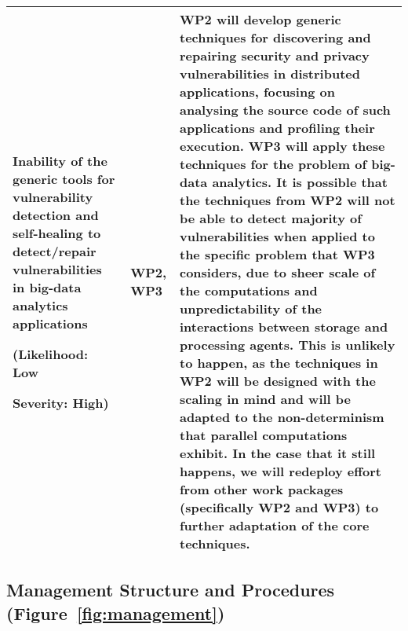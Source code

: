 \documentclass[a4paper,11pt]{article}
\begin{document}
\begin{longtable}{| p{3.5cm} | p{1.5cm} | p{11.8cm}  |}
\\\hline
Inability of the generic tools for vulnerability detection and self-healing to detect/repair vulnerabilities in big-data analytics applications
\par
({\textbf{Likelihood: Low}}
\par
{\textbf{Severity: High}})
& WP2, WP3 &
WP2 will develop generic techniques for discovering and repairing security and privacy vulnerabilities in distributed applications, focusing on analysing the source code of such applications and profiling their execution. WP3 will apply these techniques for the problem of big-data analytics. It is possible that the techniques from WP2 will not be able to detect majority of vulnerabilities when applied to the specific problem that WP3 considers, due to sheer scale of the computations and unpredictability of the interactions between storage and processing agents. This is unlikely to happen, as the techniques in WP2 will be designed with the scaling in mind and will be adapted to the non-determinism that parallel computations exhibit. In the case that it still happens, we will redeploy effort from other work packages (specifically WP2 and WP3) to further adaptation of the core techniques. 
\\\hline
\end{longtable}

\subsection{Management Structure and Procedures (Figure~\ref{fig:management})}
\label{sect:mgt}

\end{document}
